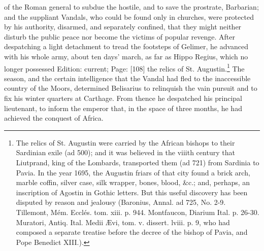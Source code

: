 of the Roman general to subdue the hostile, and to save the prostrate, Barbarian; and the suppliant Vandals, who could be found only in churches, were protected by his authority, disarmed, and separately confined, that they might neither disturb the public peace nor become the victims of popular revenge. After despatching a light detachment to tread the footsteps of Gelimer, he advanced with his whole army, about ten days\texthebrew{}’ march, as far as Hippo Regius, which no longer possessed Edition: current; Page: [108] the relics of St. Augustin.\footnote{The relics of St. Augustin were carried by the African bishops to their Sardinian exile (ad 500); and it was believed in the viiith century that Liutprand, king of the Lombards, transported them (ad 721) from Sardinia to Pavia. In the year 1695, the Augustin friars of that city found a brick arch, marble coffin, silver case, silk wrapper, bones, blood, \&c.; and, perhaps, an inscription of Agostin in Gothic letters. But this useful discovery has been disputed by reason and jealousy (Baronius, Annal. ad 725, No. 2-9. Tillemont, Mém. Ecclés. tom. xiii. p. 944. Montfaucon, Diarium Ital. p. 26-30. Muratori, Antiq. Ital. Medii Ævi, tom. v. dissert. lviii. p. 9, who had composed a separate treatise before the decree of the bishop of Pavia, and Pope Benedict XIII.).} The season, and the certain intelligence that the Vandal had fled to the inaccessible country of the Moors, determined Belisarius to relinquish the vain pursuit and to fix his winter quarters at Carthage. From thence he despatched his principal lieutenant, to inform the emperor that, in the space of three months, he had achieved the conquest of Africa.

